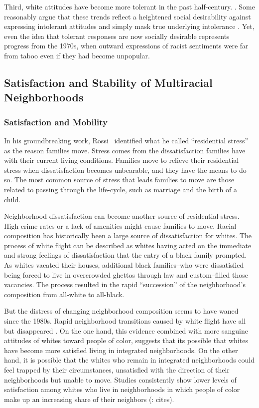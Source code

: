 \documentclass{baderart}
\newcommand{\TK}[1][]{\strong{TK #1}}
\renewcommand{\needcite}[1][]{%
	\strong{[CITE: %
		\ifthenelse{\equal{#1}{}}{}{: #1}	%
	]}}
\begin{document}
Third, white attitudes have become more tolerant in the past half-century. \TK[Examples]. Some reasonably argue that these trends reflect a heightened social desirability against expressing intolerant attitudes and simply mask true underlying intolerance \needcite. Yet, even the idea that tolerant responses are now socially desirable represents progress from the 1970s, when outward expressions of racist sentiments were far from taboo even if they had become unpopular.

\subsection{Satisfaction and Stability of Multiracial Neighborhoods}\label{sec:satisfaction-stability}

\subsubsection{Satisfaction and Mobility}\label{satisfaction-and-mobility}

In his groundbreaking work, Rossi \needcite\ identified what he called ``residential stress'' as the reason families move. Stress comes from the dissatisfaction families have with their current living conditions. Families move to relieve their residential stress when dissatisfaction becomes unbearable, and they have the means to do so. The most common source of stress that leads families to move are those related to passing through the life-cycle, such as marriage and the birth of a child. 

Neighborhood dissatisfaction can become another source of residential stress. High crime rates or a lack of amenities might cause families to move. Racial composition has historically been a large source of dissatisfaction for whites. The process of white flight can be described as whites having acted on the immediate and strong feelings of dissatisfaction that the entry of a black family prompted. As whites vacated their houses, additional black families--who were dissatisfied being forced to live in overcrowded ghettos through law and custom--filled those vacancies. The process resulted in the rapid ``succession'' of the neighborhood's composition from all-white to all-black.

But the distress of changing neighborhood composition seems to have waned since the 1980s. Rapid neighborhood transitions caused by white flight have all but disappeared \needcite[Ellen, Bader]. On the one hand, this evidence combined with more sanguine attitudes of whites toward people of color, suggests that its possible that whites have become more satisfied living in integrated neighborhoods. On the other hand, it is possible that the whites who remain in integrated neighborhoods could feel trapped by their circumstances, unsatisfied with the direction of their neighborhoods but unable to move. Studies consistently show lower levels of satisfaction among whites who live in neighborhoods in which people of color make up an increasing share of their neighbors (\TK: cites). 
\end{document}
